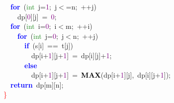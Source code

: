 \documentclass[10pt,a4paper,twoside]{article}
\begin{document}
{{{{{{{{{\mbox{}\ \ \textbf{\textcolor{Blue}{for}}\ \textcolor{BrickRed}{(}\textcolor{ForestGreen}{int}\ j\textcolor{BrickRed}{=}\textcolor{Purple}{1}\textcolor{BrickRed}{;}\ j\textcolor{BrickRed}{$<$=}n\textcolor{BrickRed}{;}\ \textcolor{BrickRed}{++}j\textcolor{BrickRed}{)} \\
\mbox{}\ \ \ \ dp\textcolor{BrickRed}{[}\textcolor{Purple}{0}\textcolor{BrickRed}{][}j\textcolor{BrickRed}{]}\ \textcolor{BrickRed}{=}\ \textcolor{Purple}{0}\textcolor{BrickRed}{;} \\
\mbox{}\ \ \textbf{\textcolor{Blue}{for}}\ \textcolor{BrickRed}{(}\textcolor{ForestGreen}{int}\ i\textcolor{BrickRed}{=}\textcolor{Purple}{0}\textcolor{BrickRed}{;}\ i\textcolor{BrickRed}{$<$}m\textcolor{BrickRed}{;}\ \textcolor{BrickRed}{++}i\textcolor{BrickRed}{)} \\
\mbox{}\ \ \ \ \textbf{\textcolor{Blue}{for}}\ \textcolor{BrickRed}{(}\textcolor{ForestGreen}{int}\ j\textcolor{BrickRed}{=}\textcolor{Purple}{0}\textcolor{BrickRed}{;}\ j\textcolor{BrickRed}{$<$}n\textcolor{BrickRed}{;}\ \textcolor{BrickRed}{++}j\textcolor{BrickRed}{)} \\
\mbox{}\ \ \ \ \ \ \textbf{\textcolor{Blue}{if}}\ \textcolor{BrickRed}{(}s\textcolor{BrickRed}{[}i\textcolor{BrickRed}{]}\ \textcolor{BrickRed}{==}\ t\textcolor{BrickRed}{[}j\textcolor{BrickRed}{])} \\
\mbox{}\ \ \ \ \ \ \ \ dp\textcolor{BrickRed}{[}i\textcolor{BrickRed}{+}\textcolor{Purple}{1}\textcolor{BrickRed}{][}j\textcolor{BrickRed}{+}\textcolor{Purple}{1}\textcolor{BrickRed}{]}\ \textcolor{BrickRed}{=}\ dp\textcolor{BrickRed}{[}i\textcolor{BrickRed}{][}j\textcolor{BrickRed}{]+}\textcolor{Purple}{1}\textcolor{BrickRed}{;} \\
\mbox{}\ \ \ \ \ \ \textbf{\textcolor{Blue}{else}} \\
\mbox{}\ \ \ \ \ \ \ \ dp\textcolor{BrickRed}{[}i\textcolor{BrickRed}{+}\textcolor{Purple}{1}\textcolor{BrickRed}{][}j\textcolor{BrickRed}{+}\textcolor{Purple}{1}\textcolor{BrickRed}{]}\ \textcolor{BrickRed}{=}\ \textbf{\textcolor{Black}{MAX}}\textcolor{BrickRed}{(}dp\textcolor{BrickRed}{[}i\textcolor{BrickRed}{+}\textcolor{Purple}{1}\textcolor{BrickRed}{][}j\textcolor{BrickRed}{],}\ dp\textcolor{BrickRed}{[}i\textcolor{BrickRed}{][}j\textcolor{BrickRed}{+}\textcolor{Purple}{1}\textcolor{BrickRed}{]);} \\
\mbox{}\ \ \textbf{\textcolor{Blue}{return}}\ dp\textcolor{BrickRed}{[}m\textcolor{BrickRed}{][}n\textcolor{BrickRed}{];} \\
\mbox{}\textcolor{Red}{\}} \\

}}}}}}}}}
\end{document}
